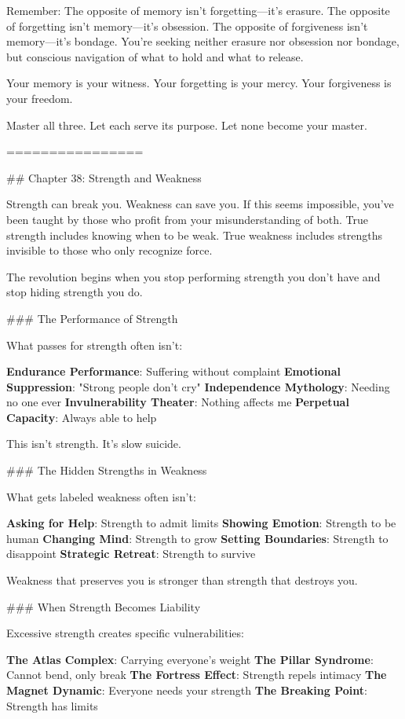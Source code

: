 \documentclass[12pt]{book}
\begin{document}
Remember: The opposite of memory isn't forgetting—it's erasure. The opposite of forgetting isn't memory—it's obsession. The opposite of forgiveness isn't memory—it's bondage. You're seeking neither erasure nor obsession nor bondage, but conscious navigation of what to hold and what to release.

Your memory is your witness. Your forgetting is your mercy. Your forgiveness is your freedom.

Master all three. Let each serve its purpose. Let none become your master.

================

\#\# Chapter 38: Strength and Weakness

Strength can break you. Weakness can save you. If this seems impossible, you've been taught by those who profit from your misunderstanding of both. True strength includes knowing when to be weak. True weakness includes strengths invisible to those who only recognize force.

The revolution begins when you stop performing strength you don't have and stop hiding strength you do.

\#\#\# The Performance of Strength

What passes for strength often isn't:

\textbf{Endurance Performance}: Suffering without complaint
\textbf{Emotional Suppression}: "Strong people don't cry"
\textbf{Independence Mythology}: Needing no one ever
\textbf{Invulnerability Theater}: Nothing affects me
\textbf{Perpetual Capacity}: Always able to help

This isn't strength. It's slow suicide.

\#\#\# The Hidden Strengths in Weakness

What gets labeled weakness often isn't:

\textbf{Asking for Help}: Strength to admit limits
\textbf{Showing Emotion}: Strength to be human
\textbf{Changing Mind}: Strength to grow
\textbf{Setting Boundaries}: Strength to disappoint
\textbf{Strategic Retreat}: Strength to survive

Weakness that preserves you is stronger than strength that destroys you.

\#\#\# When Strength Becomes Liability

Excessive strength creates specific vulnerabilities:

\textbf{The Atlas Complex}: Carrying everyone's weight
\textbf{The Pillar Syndrome}: Cannot bend, only break
\textbf{The Fortress Effect}: Strength repels intimacy
\textbf{The Magnet Dynamic}: Everyone needs your strength
\textbf{The Breaking Point}: Strength has limits
\end{document}
